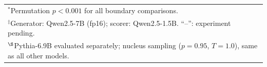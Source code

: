 \begin{table}[t]
{\begin{tabular}{lcccccccccccccccccccc}
    \bottomrule
    \multicolumn{21}{l}{\footnotesize $^*$Permutation $p < 0.001$ for all boundary comparisons.} \\
    \multicolumn{21}{l}{\footnotesize $^\ddagger$Generator: Qwen2.5-7B (fp16); scorer: Qwen2.5-1.5B. ``--'': experiment pending.} \\
    \multicolumn{21}{l}{\footnotesize $^\S$Pythia-6.9B evaluated separately; nucleus sampling ($p{=}0.95$, $T{=}1.0$), same as all other models.}
  \end{tabular}}%
\end{table}

\begin{table}[t]
  \centering
  \caption{LLM zero-shot depth classification: $5{\times}5$ confusion matrices
    (Exp-011). Both frontier LLMs achieve high binary detection accuracy
    (GPT-5.5: 0.8780; Claude Opus~4.6: 0.8818) but near-chance 5-class
    accuracy (${\sim}0.33$ vs.\ OBD-LightGBM baseline 0.386, evaluated on the full test set $N{=}5{,}000$). GPT-5.5
    strongly identifies depth-0 text (recall${=}0.7700$) but collapses on
    depth-4 (recall${=}0.0800$), misclassifying 50/100 depth-4 samples as
    depth-2. Claude Opus~4.6 shows more uniform errors across depths 1--4,
    with depth-4 recall (0.3700) substantially exceeding GPT-5.5.
    Per-depth recall comparison with OBD-LightGBM in Table~\ref{tab:s3c_perdepth}.}
  \label{tab:s3_llm_zeroshot}


\end{table}
